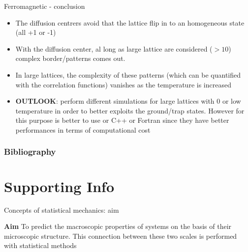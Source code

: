\documentclass{beamer}
\begin{document}
\begin{frame}{Ferromagnetic - conclusion}
\begin{itemize}
\item The diffusion centrers avoid that the lattice flip in to an homogeneous state (all +1 or -1) 
\item With the diffusion center, al long as large lattice are considered ($>10$) complex border/patterns comes out. 
\item In large lattices, the complexity of these patterns (which can be quantified with the correlation functions) vanishes as the temperature is increased 
\item \textbf{OUTLOOK}: perform different simulations for large lattices with 0 or low temperature in order to better exploits the ground/trap states. However for this purpose is better to use or C++ or Fortran since they have better performances in terms of computational cost 
\end{itemize}

\end{frame}



\begin{frame}[t,allowframebreaks]
\frametitle{Bibliography}
\printbibliography
\end{frame}



\section{Supporting Info}



\begin{frame}{Concepts of statistical mechanics: aim \cite{peliti2011statistical}}
\begin{center}
\textbf{Aim} To predict the macroscopic properties of systems on the basis of their microscopic structure. This connection between these two scales is performed with statistical methods
\end{center}
\end{frame}
\end{document}
